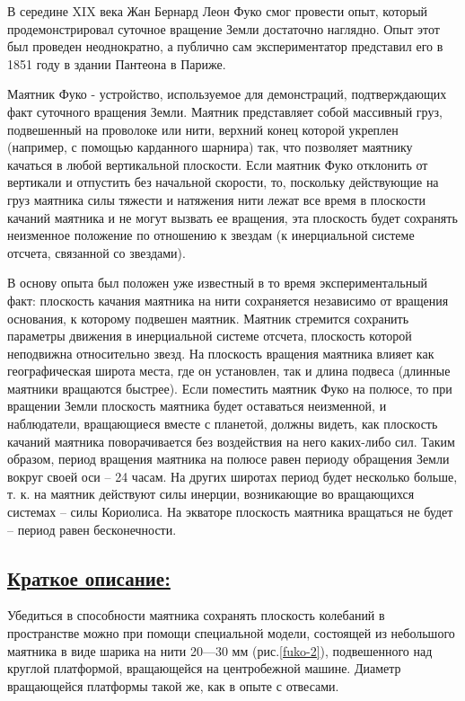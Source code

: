 \documentclass[14pt,a4paper,oneside]{extarticle}	%
\begin{document}
В середине XIX века Жан Бернард Леон Фуко смог провести опыт, который продемонстрировал суточное вращение Земли достаточно наглядно. 
Опыт этот был проведен неоднократно, а публично сам экспериментатор представил его в 1851 году в здании Пантеона в Париже.
									
Маятник Фуко - устройство, используемое для демонстраций, подтверждающих факт суточного вращения Земли.
Маятник представляет собой массивный груз, подвешенный на проволоке или нити, верхний конец которой укреплен (например, с помощью карданного шарнира) так, что позволяет маятнику качаться в любой вертикальной плоскости. 
Если маятник Фуко отклонить от вертикали и отпустить без начальной скорости, то, 
			поскольку действующие на груз маятника силы тяжести и натяжения нити лежат все время в плоскости качаний маятника и не могут вызвать ее вращения, эта плоскость будет сохранять неизменное положение
			по отношению к звездам (к инерциальной системе отсчета, связанной со звездами). 
			
В основу опыта был положен уже известный в то время экспериментальный факт: 
плоскость качания маятника на нити сохраняется независимо от вращения основания, к которому подвешен маятник. 
Маятник стремится сохранить параметры движения в инерциальной системе отсчета, плоскость которой неподвижна относительно звезд. 
На плоскость вращения маятника влияет как географическая широта места, где он установлен, так и длина подвеса (длинные маятники вращаются быстрее).	
Если поместить маятник Фуко на полюсе, то при вращении Земли плоскость маятника будет 
оставаться неизменной, и наблюдатели, вращающиеся вместе с планетой, должны видеть, 
как плоскость качаний маятника поворачивается без воздействия на него каких-либо сил. 
Таким образом, период вращения маятника на полюсе равен периоду обращения Земли вокруг своей оси – 24 часам. 
На других широтах период будет несколько больше, т. к. на маятник действуют силы инерции, возникающие во вращающихся системах – силы Кориолиса. 
На экваторе плоскость маятника вращаться не будет – период равен бесконечности.

	\newpage
	\subsection*{\underline{Краткое описание:}}
	
	Убедиться в способности маятника сохранять плоскость колебаний в пространстве можно при помощи специальной модели, состоящей из небольшого маятника в виде шарика на нити 20—30 мм (рис.\ref{fuko-2}), подвешенного над круглой платформой, вращающейся на центробежной машине.
	Диаметр вращающейся платформы такой же, как в опыте с отвесами. %
	
\end{document}
